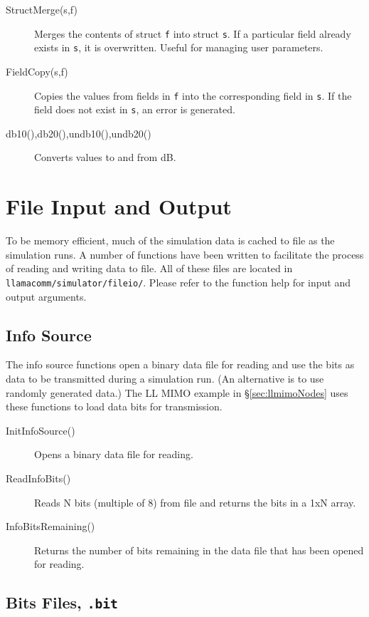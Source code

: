\begin{description}
\item[StructMerge(s,f)] Merges the contents of struct \verb+f+ into struct
\verb+s+.  If a particular field already exists in \verb+s+, it is
overwritten.  Useful for managing user parameters.

\item[FieldCopy(s,f)] Copies the values from fields in \verb+f+ into the
corresponding field in \verb+s+.  If the field does not exist in
\verb+s+, an error is generated.

\item[db10(),db20(),undb10(),undb20()] Converts values to and from dB.
\end{description}


\section{File Input and Output}

To be memory efficient, much of the simulation data is cached to
file as the simulation runs.  A number of functions have been
written to facilitate the process of reading and writing data to
file.  All of these files are located in
\verb+llamacomm/simulator/fileio/+.  Please refer to the function
help for input and output arguments.

\subsection{Info Source}

The info source functions open a binary data file for reading and
use the bits as data to be transmitted during a simulation run. (An
alternative is to use randomly generated data.)  The LL MIMO example
in \S\ref{sec:llmimoNodes} uses these functions to load data bits
for transmission.

\begin{description}
\item[InitInfoSource()] Opens a binary data file for reading.

\item[ReadInfoBits()] Reads N bits (multiple of 8) from file and returns
the bits in a 1xN array.

\item[InfoBitsRemaining()] Returns the number of bits remaining in
the data file that has been opened for reading.
\end{description}

\subsection{Bits Files, \texttt{.bit}}

